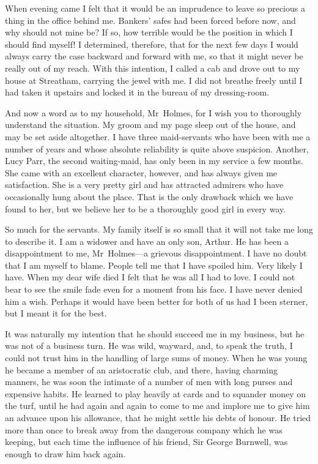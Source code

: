 When evening came I felt that it would be an imprudence to leave so precious a thing in the office behind me. Bankers' safes had been forced before now, and why should not mine be? If so, how terrible would be the position in which I should find myself! I determined, therefore, that for the next few days I would always carry the case backward and forward with me, so that it might never be really out of my reach. With this intention, I called a cab and drove out to my house at Streatham, carrying the jewel with me. I did not breathe freely until I had taken it upstairs and locked it in the bureau of my dressing-room.

And now a word as to my household, Mr~Holmes, for I wish you to thoroughly understand the situation. My groom and my page sleep out of the house, and may be set aside altogether. I have three maid-servants who have been with me a number of years and whose absolute reliability is quite above suspicion. Another, Lucy Parr, the second waiting-maid, has only been in my service a few months. She came with an excellent character, however, and has always given me satisfaction. She is a very pretty girl and has attracted admirers who have occasionally hung about the place. That is the only drawback which we have found to her, but we believe her to be a thoroughly good girl in every way.

So much for the servants. My family itself is so small that it will not take me long to describe it. I am a widower and have an only son, Arthur. He has been a disappointment to me, Mr~Holmes—a grievous disappointment. I have no doubt that I am myself to blame. People tell me that I have spoiled him. Very likely I have. When my dear wife died I felt that he was all I had to love. I could not bear to see the smile fade even for a moment from his face. I have never denied him a wish. Perhaps it would have been better for both of us had I been sterner, but I meant it for the best.

It was naturally my intention that he should succeed me in my business, but he was not of a business turn. He was wild, wayward, and, to speak the truth, I could not trust him in the handling of large sums of money. When he was young he became a member of an aristocratic club, and there, having charming manners, he was soon the intimate of a number of men with long purses and expensive habits. He learned to play heavily at cards and to squander money on the turf, until he had again and again to come to me and implore me to give him an advance upon his allowance, that he might settle his debts of honour. He tried more than once to break away from the dangerous company which he was keeping, but each time the influence of his friend, Sir George Burnwell, was enough to draw him back again.

